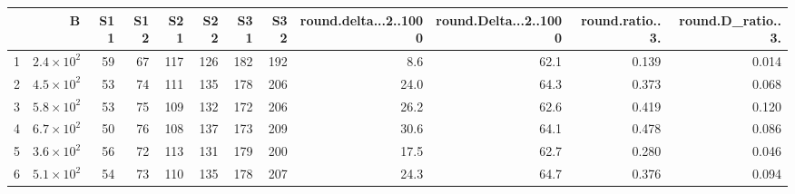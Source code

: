 \begin{table}[ht]
\centering
\begin{tabular}{lrrrrrrrrrrr}
  \hline
 & B & S11 & S12 & S21 & S22 & S31 & S32 & round.delta...2..1000 & round.Delta...2..1000 & round.ratio..3. & round.D\_ratio..3. \\ 
  \hline
1 & $2.4 \times 10^{2}$ & 59 & 67 & 117 & 126 & 182 & 192 & 8.6 & 62.1 & 0.139 & 0.014 \\ 
  2 & $4.5 \times 10^{2}$ & 53 & 74 & 111 & 135 & 178 & 206 & 24.0 & 64.3 & 0.373 & 0.068 \\ 
  3 & $5.8 \times 10^{2}$ & 53 & 75 & 109 & 132 & 172 & 206 & 26.2 & 62.6 & 0.419 & 0.120 \\ 
  4 & $6.7 \times 10^{2}$ & 50 & 76 & 108 & 137 & 173 & 209 & 30.6 & 64.1 & 0.478 & 0.086 \\ 
  5 & $3.6 \times 10^{2}$ & 56 & 72 & 113 & 131 & 179 & 200 & 17.5 & 62.7 & 0.280 & 0.046 \\ 
  6 & $5.1 \times 10^{2}$ & 54 & 73 & 110 & 135 & 178 & 207 & 24.3 & 64.7 & 0.376 & 0.094 \\ 
   \hline
\end{tabular}
\end{table}
